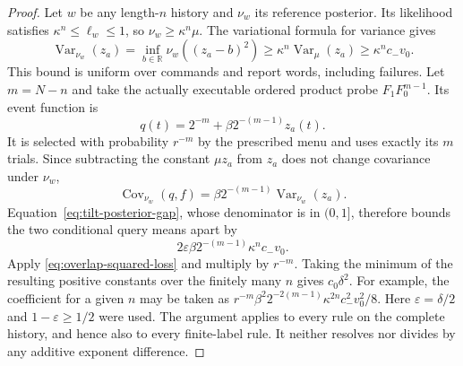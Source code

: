 \documentclass[11pt]{amsart}
\theoremstyle{definition}\newtheorem{definition}[theorem]{Definition}
\theoremstyle{remark}\newtheorem{remark}[theorem]{Remark}
\newcommand{\R}{\mathbb R}\newcommand{\N}{\mathbb N}\newcommand{\C}{\mathbb C}
\begin{document}
\begin{proof}
Let $w$ be any length-$n$ history and $\nu_w$ its reference posterior.
Its likelihood satisfies $\kappa^n\le\ell_w\le1$, so
$\nu_w\ge\kappa^n\mu$. The variational formula for variance gives
\begin{equation}\label{eq:positive-posterior-variance}
 \operatorname{Var}_{\nu_w}(z_a)
 =\inf_{b\in\R}\nu_w((z_a-b)^2)
 \ge\kappa^n\operatorname{Var}_{\mu}(z_a)
 \ge\kappa^n c_- v_0.
\end{equation}
This bound is uniform over commands and report words, including failures.
Let $m=N-n$ and take the actually executable ordered product probe
$F_1F_0^{m-1}$. Its event function is
\[
 q(t)=2^{-m}+\beta 2^{-(m-1)}z_a(t).
\]
It is selected with probability $r^{-m}$ by the prescribed menu and
uses exactly its $m$ trials. Since subtracting the constant $\mu z_a$
from $z_a$ does not change covariance under $\nu_w$,
\[
 \operatorname{Cov}_{\nu_w}(q,f)
 =\beta 2^{-(m-1)}\operatorname{Var}_{\nu_w}(z_a).
\]
Equation~\eqref{eq:tilt-posterior-gap}, whose denominator is in
$(0,1]$, therefore bounds the two conditional query means apart by
\[
 2\varepsilon\beta 2^{-(m-1)}\kappa^n c_-v_0.
\]
Apply \eqref{eq:overlap-squared-loss} and multiply by $r^{-m}$.
Taking the minimum of the resulting positive constants over the finitely
many $n$ gives $c_0\delta^2$. For example, the coefficient for a given
$n$ may be taken as
$r^{-m}\beta^2 2^{-2(m-1)}\kappa^{2n}c_-^2v_0^2/8$.
Here $\varepsilon=\delta/2$ and $1-\varepsilon\ge1/2$ were used.
The argument applies to every rule on the complete history, and hence
also to every finite-label rule. It neither resolves nor divides by any
additive exponent difference.
\end{proof}
\end{document}
